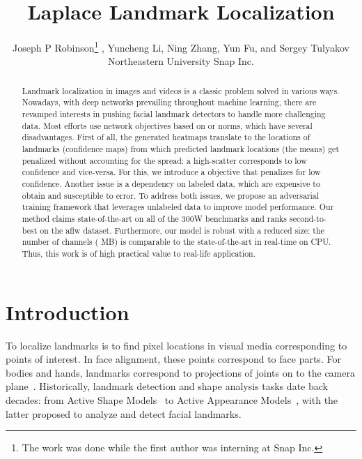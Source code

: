 \documentclass[10pt,twocolumn,letterpaper]{article}
\begin{document}
\title{Laplace Landmark Localization}

\author{Joseph P Robinson\thanks{The work was done while the first author was interning at Snap Inc.} , Yuncheng Li, Ning Zhang, Yun Fu, and Sergey Tulyakov\\
\hspace{-.4in}Northeastern University\hspace{.7in} Snap Inc. \\\vspace{2mm}
} 


\maketitle
\ificcvfinal\thispagestyle{empty}\fi

\begin{abstract}
Landmark localization in images and videos is a classic problem solved in various ways. Nowadays, with deep networks prevailing throughout machine learning, there are revamped interests in pushing facial landmark detectors to handle more challenging data. Most efforts use network objectives based on  or  norms, which have several disadvantages. First of all, the generated heatmaps translate to the locations of landmarks (\ie confidence maps) from which predicted landmark locations (\ie the means) get penalized without accounting for the spread: a high-scatter corresponds to low confidence and vice-versa. For this, we introduce a  objective that penalizes for
low confidence. Another issue is a dependency on labeled data, which are expensive to obtain and susceptible to error. To address both issues, we propose an adversarial training framework that leverages unlabeled data to improve model performance. Our method claims state-of-the-art on all of the 300W benchmarks and ranks second-to-best on the \Gls{aflw} dataset. 
Furthermore, our model is robust with a reduced size:  the number of channels ( MB) is comparable to the state-of-the-art in real-time on CPU. Thus, this work is of high practical value to real-life application.


\end{abstract}

\section{Introduction}
\label{sec:introduction}
To localize landmarks is to find pixel locations in visual media corresponding to points of interest. In face alignment, these points correspond to face parts. For bodies and hands, landmarks correspond to projections of joints on to the camera plane~\cite{supancic2015depth, wang2019ev}. Historically, landmark detection and shape analysis tasks date back decades: from Active Shape Models~\cite{cootes1992active} to Active Appearance Models~\cite{cootes2001active}, with the latter proposed to analyze and detect facial landmarks.
\end{document}
